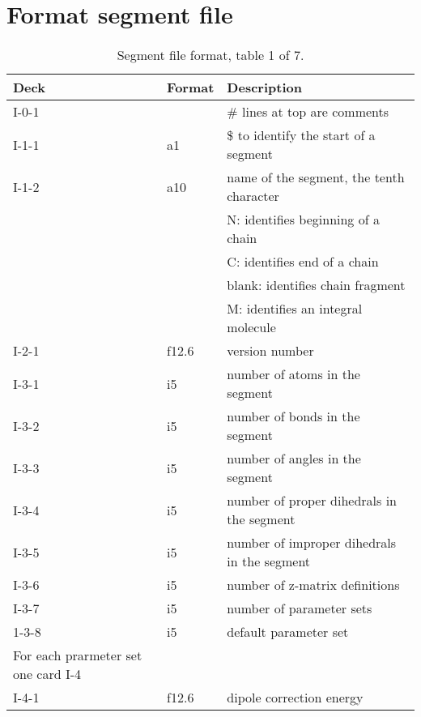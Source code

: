 \section {Format segment file}

\begin{table}[h]
\begin{center}
\begin{tabular*}{150mm}{p{15mm}p{12mm}l}
\hline\hline
Deck  & Format & Description \\ \hline
I-0-1 &        & \# lines at top are comments \\
I-1-1 & a1     & \$ to identify the start of a segment \\ %
I-1-2 & a10    & name of the segment, the tenth character\\
      &        & N: identifies beginning of a chain\\
      &        & C: identifies end of a chain\\
      &        & blank: identifies chain fragment\\
      &        & M: identifies an integral molecule\\
\hline
I-2-1 & f12.6  & version number \\
\hline
I-3-1 & i5     & number of atoms in the segment\\
I-3-2 & i5     & number of bonds in the segment\\
I-3-3 & i5     & number of angles in the segment\\
I-3-4 & i5     & number of proper dihedrals in the segment\\
I-3-5 & i5     & number of improper dihedrals in the segment\\
I-3-6 & i5     & number of z-matrix definitions\\
I-3-7 & i5     & number of parameter sets \\
1-3-8 & i5     & default parameter set\\
\hline
For each prarmeter set one card I-4\\
\hline
I-4-1 & f12.6  & dipole correction energy \\
\hline
\end{tabular*}
\caption{Segment file format, table 1 of 7.\label{tbl:nwmdseg1}}
\end{center}
\end{table}

